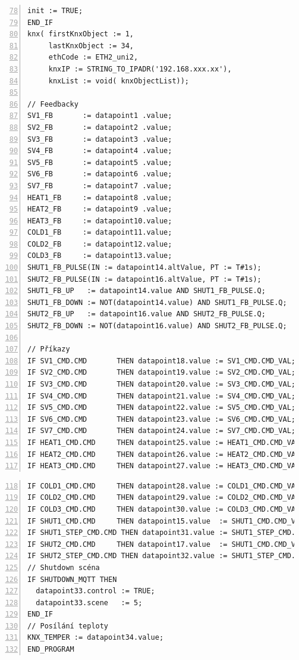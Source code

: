 \begin{lstlisting}[language=ST, breaklines=true, numbers=left, firstnumber=78, numberstyle=\small, numbersep=10pt, frame=single, basicstyle=\ttfamily\small]   
  init := TRUE;
END_IF
knx( firstKnxObject := 1,
     lastKnxObject := 34,
     ethCode := ETH2_uni2,
     knxIP := STRING_TO_IPADR('192.168.xxx.xx'),
     knxList := void( knxObjectList));

// Feedbacky
SV1_FB       := datapoint1 .value;
SV2_FB       := datapoint2 .value;
SV3_FB       := datapoint3 .value;
SV4_FB       := datapoint4 .value;
SV5_FB       := datapoint5 .value;
SV6_FB       := datapoint6 .value;
SV7_FB       := datapoint7 .value;
HEAT1_FB     := datapoint8 .value;
HEAT2_FB     := datapoint9 .value;
HEAT3_FB     := datapoint10.value;
COLD1_FB     := datapoint11.value;
COLD2_FB     := datapoint12.value;
COLD3_FB     := datapoint13.value;
SHUT1_FB_PULSE(IN := datapoint14.altValue, PT := T#1s);
SHUT2_FB_PULSE(IN := datapoint16.altValue, PT := T#1s);
SHUT1_FB_UP   := datapoint14.value AND SHUT1_FB_PULSE.Q;
SHUT1_FB_DOWN := NOT(datapoint14.value) AND SHUT1_FB_PULSE.Q;
SHUT2_FB_UP   := datapoint16.value AND SHUT2_FB_PULSE.Q;
SHUT2_FB_DOWN := NOT(datapoint16.value) AND SHUT2_FB_PULSE.Q;

// Příkazy
IF SV1_CMD.CMD       THEN datapoint18.value := SV1_CMD.CMD_VAL; END_IF;
IF SV2_CMD.CMD       THEN datapoint19.value := SV2_CMD.CMD_VAL; END_IF;
IF SV3_CMD.CMD       THEN datapoint20.value := SV3_CMD.CMD_VAL; END_IF;
IF SV4_CMD.CMD       THEN datapoint21.value := SV4_CMD.CMD_VAL; END_IF;
IF SV5_CMD.CMD       THEN datapoint22.value := SV5_CMD.CMD_VAL; END_IF;
IF SV6_CMD.CMD       THEN datapoint23.value := SV6_CMD.CMD_VAL; END_IF;
IF SV7_CMD.CMD       THEN datapoint24.value := SV7_CMD.CMD_VAL; END_IF;
IF HEAT1_CMD.CMD     THEN datapoint25.value := HEAT1_CMD.CMD_VAL; END_IF;
IF HEAT2_CMD.CMD     THEN datapoint26.value := HEAT2_CMD.CMD_VAL; END_IF;
IF HEAT3_CMD.CMD     THEN datapoint27.value := HEAT3_CMD.CMD_VAL; END_IF;
\end{lstlisting}
\pagebreak
\begin{lstlisting}[language=ST, breaklines=true, numbers=left, firstnumber=118, numberstyle=\small, numbersep=10pt, frame=single, basicstyle=\ttfamily\small]
IF COLD1_CMD.CMD     THEN datapoint28.value := COLD1_CMD.CMD_VAL; END_IF;
IF COLD2_CMD.CMD     THEN datapoint29.value := COLD2_CMD.CMD_VAL; END_IF;
IF COLD3_CMD.CMD     THEN datapoint30.value := COLD3_CMD.CMD_VAL; END_IF;
IF SHUT1_CMD.CMD     THEN datapoint15.value  := SHUT1_CMD.CMD_VAL; END_IF;
IF SHUT1_STEP_CMD.CMD THEN datapoint31.value := SHUT1_STEP_CMD.CMD_VAL; END_IF;
IF SHUT2_CMD.CMD     THEN datapoint17.value  := SHUT1_CMD.CMD_VAL; END_IF;
IF SHUT2_STEP_CMD.CMD THEN datapoint32.value := SHUT1_STEP_CMD.CMD_VAL; END_IF;
// Shutdown scéna
IF SHUTDOWN_MQTT THEN
  datapoint33.control := TRUE;
  datapoint33.scene   := 5;
END_IF
// Posílání teploty
KNX_TEMPER := datapoint34.value;
END_PROGRAM
\end{lstlisting}
\pagebreak
